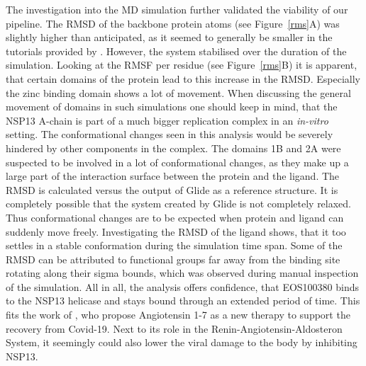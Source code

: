 \documentclass[11pt, letterpaper, titlepage]{article}
\renewcommand{\cite}{\parencite}
\begin{document}
\noindent The investigation into the \acf{MD} simulation further validated the viability of our pipeline. The RMSD of the backbone protein atoms (see Figure~\ref{rms}A) was slightly higher than anticipated, as it seemed to generally be smaller in the tutorials provided by \citeauthor{Lemkul2018}. However, the system stabilised over the duration of the simulation. Looking at the RMSF per residue (see Figure~\ref{rms}B) it is apparent, that certain domains of the protein lead to this increase in the RMSD. Especially the zinc binding domain shows a lot of movement. When discussing the general movement of domains in such simulations one should keep in mind, that the NSP13 A-chain is part of a much bigger replication complex \cite{NSP13_basics} in an \textit{in-vitro} setting. The conformational changes seen in this analysis would be severely hindered by other components in the complex. The domains 1B and 2A were suspected to be involved in a lot of conformational changes, as they make up a large part of the interaction surface between the protein and the ligand. The RMSD is calculated versus the output of Glide as a reference structure. It is completely possible that the system created by Glide is not completely relaxed. Thus conformational changes are to be expected when protein and ligand can suddenly move freely. Investigating the RMSD of the ligand shows, that it too settles in a stable conformation during the simulation time span. Some of the RMSD can be attributed to functional groups far away from the binding site rotating along their sigma bounds, which was observed during manual inspection of the simulation. All in all, the analysis offers confidence, that EOS100380 binds to the NSP13 helicase and stays bound through an extended period of time. This fits the work of \textcite{angio}, who propose Angiotensin 1-7 as a new therapy to support the recovery from Covid-19. Next to its role in the Renin-Angiotensin-Aldosteron System, it seemingly could also lower the viral damage to the body by inhibiting NSP13.
\end{document}
